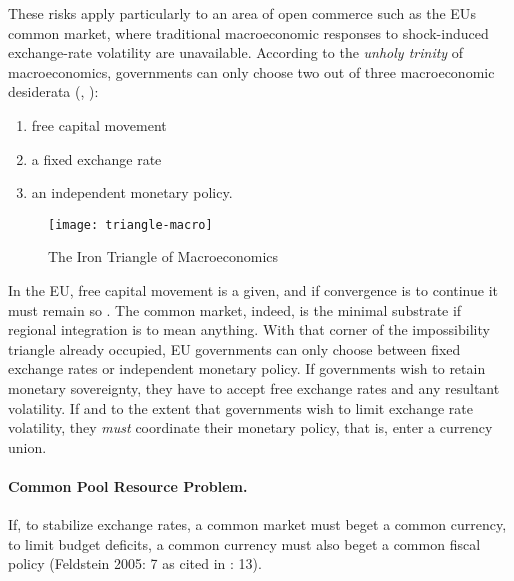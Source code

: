 These risks apply particularly to an area of open commerce such as the \gls{EU}s common market, where traditional macroeconomic responses to shock-induced exchange-rate volatility are unavailable. According to the \emph{unholy trinity} of macroeconomics, governments can only choose two out of three macroeconomic desiderata (\citealt{Mundell1963}, \citealt{Fleming1962}):
\begin{enumerate}
	\item free capital movement
	\item a fixed exchange rate
	\item an independent monetary policy.
\end{enumerate}

 \begin{figure}[htbp]
	\centering
	\texttt{[image: triangle-macro]}
	\caption{The Iron Triangle of Macroeconomics}
	\label{fig:triangle-macro}
\end{figure}

In the \gls{EU}, free capital movement is a given, and if convergence is to continue it must remain so \citep{Abiad2007}. The common market, indeed, is the minimal substrate if regional integration is to mean anything. With that corner of the impossibility triangle already occupied, \gls{EU} governments can only choose between fixed exchange rates or independent monetary policy. If governments wish to retain monetary sovereignty, they have to accept free exchange rates and any resultant volatility. If and to the extent that governments wish to limit exchange rate volatility, they \emph{must} coordinate their monetary policy, that is, enter a currency union.

\paragraph[Fiscal-CPR]{Common Pool Resource Problem.}  \label{sec:Fiscal-CPR} If, to stabilize exchange rates, a common market must beget a common currency, to limit budget deficits, a common currency must also beget a common fiscal policy (Feldstein 2005: 7 as cited in \citealt{Begg2008}: 13).

